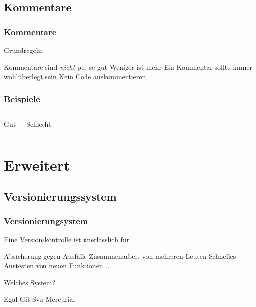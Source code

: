 \documentclass{beamer}
\begin{document}
\subsection{Kommentare}
\begin{frame}
    \frametitle{Kommentare}
    Grundregeln:

    \begin{outline}
        \pause
        \1 Kommentare sind \emph{nicht} per se gut
        \pause
        \1 Weniger ist mehr
        \pause
        \1 Ein Kommentar sollte immer wohlüberlegt sein
        \pause
        \1 Kein Code auskommentieren
    \end{outline}
\end{frame}
\begin{frame}
    \frametitle{Beispiele}
    \begin{columns}[t]
        \begin{center}
            \huge \color{green} Gut
        \end{center}
        \begin{center}
            \huge \color{red} Schlecht
        \end{center}
    \end{columns}
\end{frame}

\section{Erweitert}
\begin{frame}
    \tableofcontents[currentsection]
\end{frame}
\subsection{Versionierungssystem}
\begin{frame}
    \frametitle{Versionierungsystem}

    Eine Versionskontrolle ist unerlässlich für
    \begin{outline}
        \1 Absicherung gegen Ausfälle
        \1 Zusammenarbeit von mehreren Leuten
        \1 Schnelles Austesten von neuen Funktionen
        \1 ...
    \end{outline} \pause

    Welches System?
    \begin{outline}
        \1 Egal
        \2 Git
        \2 Svn
        \2 Mercurial
    \end{outline}
\end{frame}
\end{document}
